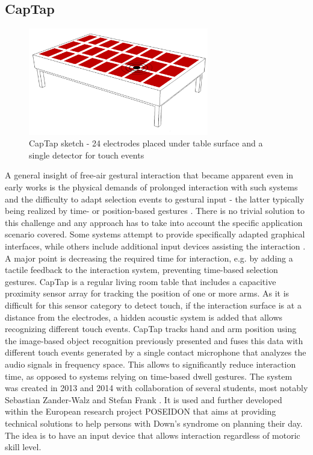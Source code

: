 \subsection{CapTap}
\label{ch:prot_captap}
\begin{figure}[h]
\centering
\includegraphics[width=0.7\textwidth]{images/captap_v2}
\caption{CapTap sketch - 24 electrodes placed under table surface and a single detector for touch events}
\label{fig:captap_sketch}
\end{figure}
A general insight of free-air gestural interaction that became apparent even in early works is the physical demands of prolonged interaction with such systems \cite{Baudel1993, lenman2002} and the difficulty to adapt selection events to gestural input - the latter typically being realized by time- or position-based gestures \cite{Baudel1993,Krum2002}. There is no trivial solution to this challenge and any approach has to take into account the specific application scenario covered. Some systems attempt to provide specifically adapted graphical interfaces, while others include additional input devices assisting the interaction \cite{Wu2003,zimmerman1987hand}. A major point is decreasing the required time for interaction, e.g. by adding a tactile feedback to the interaction system, preventing time-based selection gestures. CapTap is a regular living room table that includes a capacitive proximity sensor array for tracking the position of one or more arms. As it is difficult for this sensor category to detect touch, if the interaction surface is at a distance from the electrodes, a hidden acoustic system is added that allows recognizing different touch events. CapTap tracks hand and arm position using the image-based object recognition previously presented and fuses this data with different touch events generated by a single contact microphone that analyzes the audio signals in frequency space. This allows to significantly reduce interaction time, as opposed to systems relying on time-based dwell gestures. The system was created in 2013 and 2014 with collaboration of several students, most notably Sebastian Zander-Walz and Stefan Frank \cite{Braun2013captap}. It is used and further developed within the European research project POSEIDON that aims at providing technical solutions to help persons with Down's syndrome on planning their day. The idea is to have an input device that allows interaction regardless of motoric skill level.
